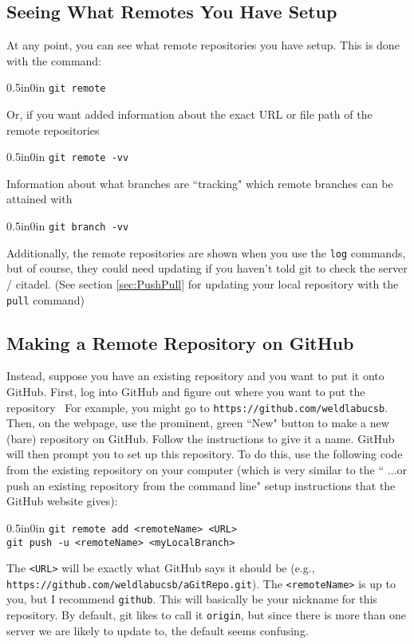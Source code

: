 \documentclass[11pt]{article}
\newcommand{\code}[1]{\begin{adjustwidth}{0.5in}{0in}
    \texttt{#1}
    \end{adjustwidth}}
\begin{document}
\subsection{Seeing What Remotes You Have Setup}

At any point, you can see what remote repositories you have setup.  This is done with the command:

\code{git remote}

Or, if you want added information about the exact URL or file path of the remote repositories

\code{git remote -vv}

Information about what branches are ``tracking" which remote branches can be attained with 

\code{git branch -vv}

Additionally, the remote repositories are shown when you use the \texttt{log} commands, but of course, they could need updating if you haven't told git to check the server / citadel.  (See section \ref{sec:PushPull} for updating your local repository with the \texttt{pull} command)

\subsection{Making a Remote Repository on GitHub}

Instead, suppose you have an existing repository and you want to put it onto GitHub.  First, log into GitHub and figure out where you want to put the repository \textemdash\ For example, you might go to \texttt{https://github.com/weldlabucsb}.  Then, on the webpage, use the prominent, green ``New" button to make a new (bare) repository on GitHub.  Follow the instructions to give it a name.  GitHub will then prompt you to set up this repository.  To do this, use the following code from the existing repository on your computer (which is very similar to the `` ...or push an existing repository from the command line" setup instructions that the GitHub website gives):

\code{git remote add <remoteName> <URL>\\
git push -u <remoteName> <myLocalBranch>}

The \texttt{<URL>} will be exactly what GitHub says it should be (e.g., \texttt{https://github.com/weldlabucsb/aGitRepo.git}).  The \texttt{<remoteName>} is up to you, but I recommend \texttt{github}.  This will basically be your nickname for this repository.  By default, git likes to call it \texttt{origin}, but since there is more than one server we are likely to update to, the default seems confusing.
\end{document}
